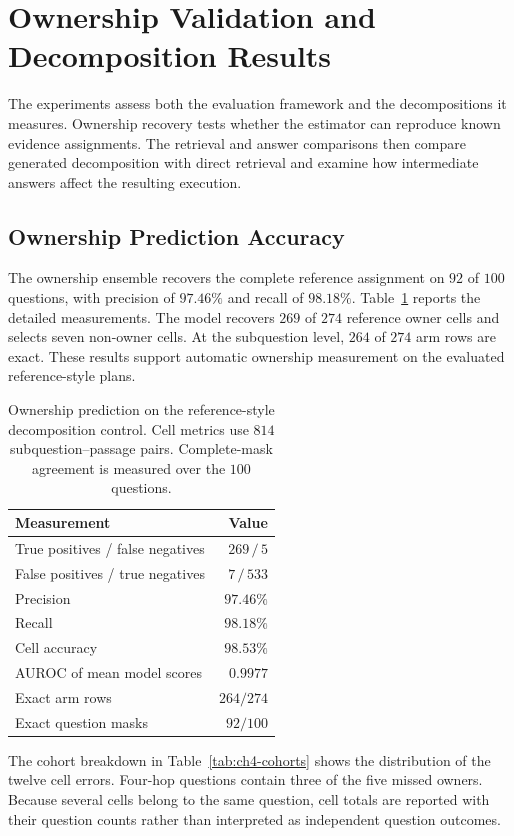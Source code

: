 \section{Ownership Validation and Decomposition Results}
\label{sec:ch4-results}

The experiments assess both the evaluation framework and the decompositions
it measures. Ownership recovery tests whether the estimator can reproduce
known evidence assignments. The retrieval and answer comparisons then compare 
generated decomposition with direct retrieval and examine how intermediate 
answers affect the resulting execution.

\subsection{Ownership Prediction Accuracy}

The ownership ensemble recovers the complete reference assignment on
$92$ of $100$ questions, with precision of $97.46\%$ and recall of $98.18\%$.
Table~\ref{tab:ch4-ownership} reports the detailed measurements. The model
recovers $269$ of $274$ reference owner cells and selects seven non-owner
cells. At the subquestion level, $264$ of $274$ arm rows are exact. These
results support automatic ownership measurement on the evaluated
reference-style plans.

\begin{table}[htbp]
\centering
\caption{Ownership prediction on the reference-style decomposition control.
Cell metrics use $814$ subquestion--passage pairs. Complete-mask agreement is
measured over the $100$ questions.}
\label{tab:ch4-ownership}
\begin{tabular}{lr}
\hline
Measurement & Value \\
\hline
True positives / false negatives & $269\,/\,5$ \\
False positives / true negatives & $7\,/\,533$ \\
Precision & $97.46\%$ \\
Recall & $98.18\%$ \\
Cell accuracy & $98.53\%$ \\
AUROC of mean model scores & $0.9977$ \\
Exact arm rows & $264/274$ \\
Exact question masks & $92/100$ \\
\hline
\end{tabular}
\end{table}

The cohort breakdown in Table~\ref{tab:ch4-cohorts} shows the distribution of
the twelve cell errors. Four-hop questions contain three of the five missed
owners. Because several cells belong to the same question, cell totals are
reported with their question counts rather than interpreted as independent
question outcomes.

